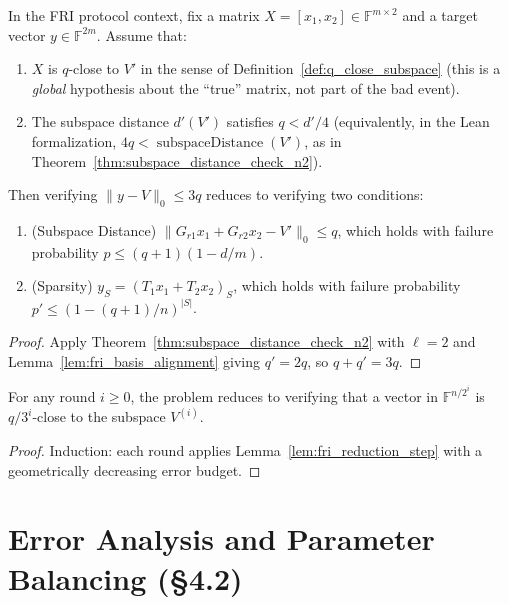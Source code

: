 \begin{lemma} \label{lem:fri_reduction_step}  \leanok
{}
In the FRI protocol context, fix a matrix $X = [x_1, x_2] \in \mathbb{F}^{m \times 2}$ and a target vector $y \in \mathbb{F}^{2m}$.
Assume that:
\begin{enumerate}
    \item $X$ is $q$-close to $V'$ in the sense of Definition~\ref{def:q_close_subspace} (this is a \emph{global} hypothesis about the ``true'' matrix, not part of the bad event).
    \item The subspace distance $d'(V')$ satisfies $q < d'/4$ (equivalently, in the Lean formalization, $4q < \operatorname{subspaceDistance}(V')$, as in Theorem~\ref{thm:subspace_distance_check_n2}).
\end{enumerate}
Then verifying $\|y - V\|_0 \leq 3q$ reduces to verifying two conditions:
\begin{enumerate}
    \item (Subspace Distance) $\|G_{r1}x_1 + G_{r2}x_2 - V'\|_0 \leq q$, which holds with failure probability $p \leq (q+1)(1-d/m)$.
    \item (Sparsity) $y_S = (T_1x_1 + T_2x_2)_S$, which holds with failure probability $p' \leq (1-(q+1)/n)^{|S|}$.
\end{enumerate}
\end{lemma}
\begin{proof} \leanok
Apply Theorem~\ref{thm:subspace_distance_check_n2} with $\ell=2$ and Lemma~\ref{lem:fri_basis_alignment} giving $q'=2q$, so $q+q' = 3q$.
\end{proof}

\begin{lemma}\label{lem:fri_recursive_application} \leanok
{}
For any round $i \geq 0$, the problem reduces to verifying that a vector in $\mathbb{F}^{n/2^i}$ is $q/3^i$-close to the subspace $V^{(i)}$.
\end{lemma}
\begin{proof} \leanok
Induction: each round applies Lemma~\ref{lem:fri_reduction_step} with a geometrically decreasing error budget.
\end{proof}

\section*{Error Analysis and Parameter Balancing (§4.2)}

